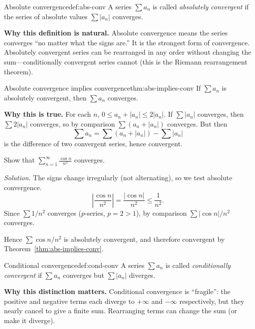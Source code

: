 \begin{definition}{Absolute convergence}{def:abs-conv}
A series $\sum a_n$ is called \emph{absolutely convergent} if the series of absolute values $\sum |a_n|$ converges.
\end{definition}

\noindent
\textbf{Why this definition is natural.}
Absolute convergence means the series converges ``no matter what the signs are.'' It is the strongest form of convergence. Absolutely convergent series can be rearranged in any order without changing the sum---conditionally convergent series cannot (this is the Riemann rearrangement theorem).

\begin{theorem}{Absolute convergence implies convergence}{thm:abs-implies-conv}
If $\sum a_n$ is absolutely convergent, then $\sum a_n$ converges.
\end{theorem}

\noindent
\textbf{Why this is true.}
For each $n$, $0\le a_n+|a_n|\le 2|a_n|$. If $\sum|a_n|$ converges, then $\sum 2|a_n|$ converges, so by comparison $\sum(a_n+|a_n|)$ converges. But then
\[
\sum a_n=\sum(a_n+|a_n|)-\sum|a_n|
\]
is the difference of two convergent series, hence convergent.

\begin{examplebox}[title={Worked Example (Lecture Example 5.9): $\sum \frac{\cos n}{n^2}$ converges absolutely}]
Show that $\displaystyle\sum_{n=1}^{\infty}\frac{\cos n}{n^2}$ converges.

\emph{Solution.}
The signs change irregularly (not alternating), so we test absolute convergence.
\[
\left|\frac{\cos n}{n^2}\right|=\frac{|\cos n|}{n^2}\le \frac{1}{n^2}.
\]
Since $\sum 1/n^2$ converges ($p$-series, $p=2>1$), by comparison $\sum |\cos n|/n^2$ converges.

Hence $\sum \cos n/n^2$ is absolutely convergent, and therefore $\displaystyle\boxed{\text{convergent}}$ by Theorem~\ref{thm:abs-implies-conv}.
\end{examplebox}

\begin{definition}{Conditional convergence}{def:cond-conv}
A series $\sum a_n$ is called \emph{conditionally convergent} if $\sum a_n$ converges but $\sum |a_n|$ diverges.
\end{definition}

\noindent
\textbf{Why this distinction matters.}
Conditional convergence is ``fragile'': the positive and negative terms each diverge to $+\infty$ and $-\infty$ respectively, but they nearly cancel to give a finite sum. Rearranging terms can change the sum (or make it diverge).

